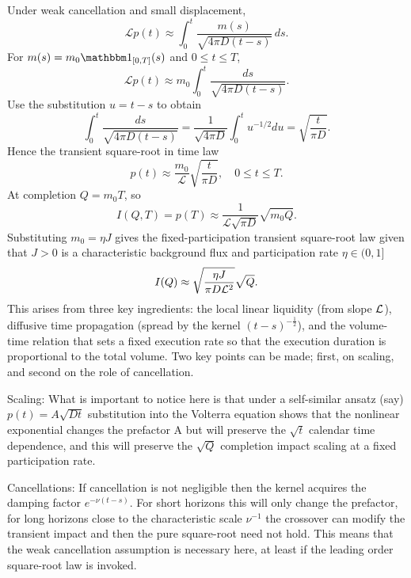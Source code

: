 \documentclass[5p,final]{elsarticle}
\begin{document}
Under weak cancellation and small displacement,
\begin{equation}
\mathcal L p(t)\approx \int_0^t \frac{m(s)}{\sqrt{4\pi D(t-s)}}\,ds.
\end{equation}
For $m(s)=m_0\mathbbm 1_{[0,T]}(s)$ and $0\le t\le T$,
\begin{equation}
\mathcal L p(t)\approx m_0\int_0^t \frac{ds}{\sqrt{4\pi D(t-s)}}.
\end{equation}
Use the substitution $u=t-s$ to obtain
\begin{equation}
\int_0^t \frac{ds}{\sqrt{4\pi D(t-s)}}
=
\frac{1}{\sqrt{4\pi D}}\int_0^t u^{-1/2}du
=
\sqrt{\frac{t}{\pi D}}.
\end{equation}
Hence the transient square-root in time law
\begin{equation}
 p(t)\approx \frac{m_0}{\mathcal L}\sqrt{\frac{t}{\pi D}}, \quad 0 \le t \le T.
\end{equation}
At completion $Q=m_0T$, so
\begin{equation}
I(Q,T)=p(T)\approx \frac{1}{\mathcal L\sqrt{\pi D}}\sqrt{m_0Q}.
\end{equation}
Substituting $m_0=\eta J$ gives the fixed-participation transient square-root law given that $J>0$ is a characteristic background flux and participation rate $\eta \in (0, 1]$
\begin{equation}
    I(Q) \approx \sqrt{\frac{\eta J}{\pi D {\cal L}^2}} \sqrt{Q}.
\end{equation}
This arises from three key ingredients: the local linear liquidity (from slope $\cal L$), diffusive time propagation (spread by the kernel $(t-s)^{-\frac{1}{2}}$), and the volume-time relation that sets a fixed execution rate so that the execution duration is proportional to the total volume. Two key points can be made; first, on scaling, and second on the role of cancellation. 

Scaling: What is important to notice here is that under a self-similar ansatz (say) $p(t) = A \sqrt{Dt}$ substitution into the Volterra equation shows that the nonlinear exponential changes the prefactor A but will preserve the $\sqrt{t}$ calendar time dependence, and this will preserve the $\sqrt{Q}$ completion impact scaling at a fixed participation rate.  

Cancellations: If cancellation is not negligible then the kernel acquires the damping factor $e^{-\nu(t-s)}$. For short horizons this will only change the prefactor, for long horizons close to the characteristic scale $\nu^{-1}$ the crossover can modify the transient impact and then the pure square-root need not hold. This means that the weak cancellation assumption is necessary here, at least if the leading order square-root law is invoked. 
\end{document}

